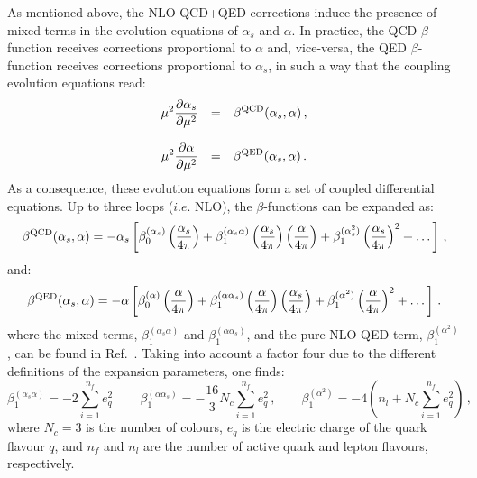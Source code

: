 As mentioned above, the NLO QCD+QED corrections induce the presence of
mixed terms in the evolution equations of $\alpha_s$ and $\alpha$.
%
In practice, the QCD $\beta$-function receives corrections
proportional to $\alpha$ and, vice-versa, the QED $\beta$-function
receives corrections proportional to $\alpha_s$, in such a way that
the coupling evolution equations read:
\begin{equation}\label{CoupledEq}
\begin{array}{rcl}
\displaystyle \mu^2\frac{\partial \alpha_s}{\partial \mu^2} &=& \displaystyle
                                                \beta^{\rm QCD}(\alpha_s,\alpha)\,,\\
\\
\displaystyle \mu^2\frac{\partial \alpha}{\partial \mu^2} &=& \displaystyle \beta^{\rm QED}(\alpha_s,\alpha)\,.
\end{array}
\end{equation}
As a consequence, these evolution equations form a set of coupled
differential equations. Up to three loops ($i.e.$ NLO), the
$\beta$-functions can be expanded as:
\begin{equation}
\beta^{\rm QCD}(\alpha_s,\alpha) = -\alpha_s\left[\beta_0^{(\alpha_s)}\left(\frac{\alpha_s}{4\pi}\right)+\beta_1^{(\alpha_s\alpha)}\left(\frac{\alpha_s}{4\pi}\right) \left(\frac{\alpha}{4\pi}\right)+\beta_1^{(\alpha_s^2)}\left(\frac{\alpha_s}{4\pi}\right)^2+\dots\right]\,,
\end{equation}
and:
\begin{equation}
\beta^{\rm QED}(\alpha_s,\alpha) = -\alpha\left[\beta_0^{(\alpha)}\left(\frac{\alpha}{4\pi}\right)+\beta_1^{(\alpha\alpha_s)}\left(\frac{\alpha}{4\pi}\right) \left(\frac{\alpha_s}{4\pi}\right)+\beta_1^{(\alpha^2)}\left(\frac{\alpha}{4\pi}\right)^2+\dots\right]\,.
\end{equation}
where the mixed terms, $\beta_1^{(\alpha_s\alpha)}$ and
$\beta_1^{(\alpha\alpha_s)}$, and the pure NLO QED term,
$\beta_1^{(\alpha^2)}$, can be found in
Ref.~\cite{Surguladze:1996hx}. Taking into account a factor four due
to the different definitions of the expansion parameters, one finds:
\begin{equation}\label{eq:NewBetaTerms}
\beta_1^{(\alpha_s\alpha)} = -2\sum_{i=1}^{n_f}
e_q^2\,\qquad\beta_1^{(\alpha\alpha_s)} = -\frac{16}{3}N_c\sum_{i=1}^{n_f} e_q^2\,,\qquad \beta_1^{(\alpha^2)} = -4\left(n_l+N_c\sum_{i=1}^{n_f} e_q^2\right)\,,
\end{equation}
where $N_c=3$ is the number of colours, $e_q$ is the electric charge
of the quark flavour $q$, and $n_f$ and $n_l$ are the number of active
quark and lepton flavours, respectively.

